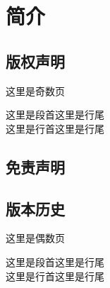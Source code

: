\chapter{简介}
	\section{版权声明}
	这里是奇数页\par
	这里是段首\hfill 这里是行尾\\
	这里是行首\hfill 这里是行尾\\
	
	\section{免责声明}
	
	\newpage
	\section{版本历史}
	这里是偶数页\par
	这里是段首\hfill 这里是行尾\\
	这里是行首\hfill 这里是行尾\\